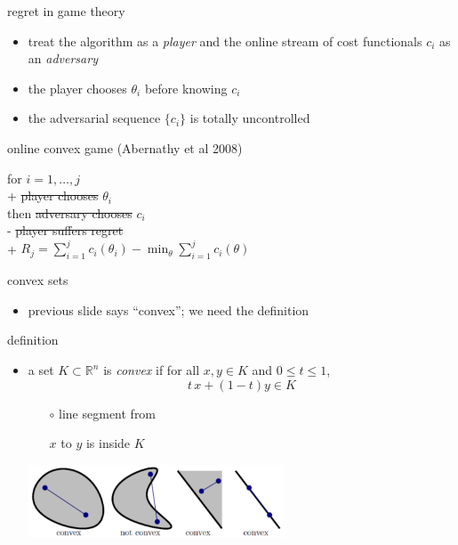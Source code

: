 \documentclass[xcolor={svgnames},
               hyperref={colorlinks,citecolor=DeepPink4,linkcolor=FireBrick,urlcolor=Maroon},
               usepdftitle=false]  %
               {beamer}
\newcommand{\RR}{\mathbb{R}}
\newcommand{\ds}{\displaystyle}
\begin{document}
\begin{frame}{regret in game theory}

\begin{itemize}
\item treat the algorithm as a \emph{player} and the online stream of cost functionals $c_i$ as an \emph{adversary}
\item the player chooses $\theta_{i}$ \alert{before} knowing $c_{i}$
\item the adversarial sequence $\{c_i\}$ is totally uncontrolled
\end{itemize}

\begin{block}{online convex game (Abernathy et al 2008)}
\begin{pseudo*}
for $i = 1,\dots,j$ \\+
    \st{player chooses} $\theta_{i}$ \\
    then \st{adversary chooses} $c_{i}$ \\-
\st{player suffers regret} \\+
    $\ds R_j = \sum_{i=1}^j c_i(\theta_i) - \min_\theta \sum_{i=1}^j c_i(\theta)$
\end{pseudo*}
\end{block}
\end{frame}


\begin{frame}{convex sets}

\begin{itemize}
\item previous slide says ``convex''; we need the definition
\end{itemize}

\begin{block}{definition}
\begin{itemize}
\item a set $K \subset \RR^n$ is \emph{convex} if for all $x,y \in K$ and $0 \le t \le 1$,
  $$t\, x + (1-t) y \in K$$

    \begin{itemize}
    \item[$\circ$] line segment from
    \item[]  $x$ to $y$ is inside $K$
    \end{itemize}

\vspace{-8mm}
\hfill \includegraphics[width=0.6\textwidth]{figs/convex}
\end{itemize}
\end{block}
\end{frame}
\end{document}
